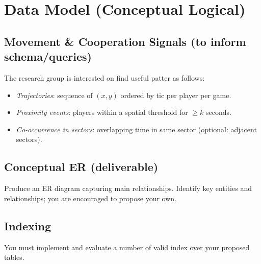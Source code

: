 \documentclass[11pt]{article}
\begin{document}
\section{Data Model (Conceptual \textrightarrow Logical)}

\subsection*{Movement \& Cooperation Signals (to inform schema/queries)}
The research group is interested on find useful patter as follows:

\begin{itemize}[leftmargin=*]
  \item \emph{Trajectories}: sequence of $(x,y)$ ordered by tic per player per game.
  \item \emph{Proximity events}: players within a spatial threshold for $\geq k$ seconds.
  \item \emph{Co-occurrence in sectors}: overlapping time in same sector (optional:
  adjacent sectors).
\end{itemize}

\subsection*{Conceptual ER (deliverable)}
Produce an ER diagram capturing main relationships.  Identify key entities and relationships; you are encouraged to propose your own.


\subsection*{Indexing}
You must implement and evaluate a number of valid index over your proposed tables.
\end{document}
